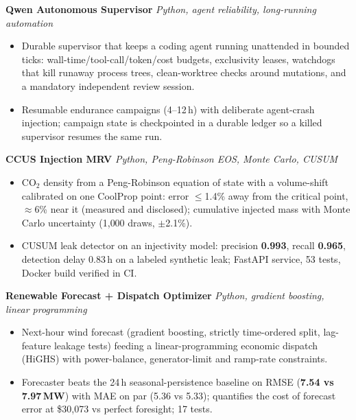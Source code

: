 \documentclass[10pt]{article}
\newcommand{\projectentry}[2]{%
  \noindent\textbf{#1} \hfill \textit{#2}\\[-0.3em]
}
\begin{document}
\projectentry{Qwen Autonomous Supervisor}{Python, agent reliability, long-running automation}
\begin{itemize}
  \item Durable supervisor that keeps a coding agent running unattended in bounded ticks: wall-time/tool-call/token/cost budgets, exclusivity leases, watchdogs that kill runaway process trees, clean-worktree checks around mutations, and a mandatory independent review session.
  \item Resumable endurance campaigns (4--12\,h) with deliberate agent-crash injection; campaign state is checkpointed in a durable ledger so a killed supervisor resumes the same run.
\end{itemize}

\projectentry{CCUS Injection MRV}{Python, Peng-Robinson EOS, Monte Carlo, CUSUM}
\begin{itemize}
  \item CO$_2$ density from a Peng-Robinson equation of state with a volume-shift calibrated on one CoolProp point: error $\leq$1.4\% away from the critical point, $\approx$6\% near it (measured and disclosed); cumulative injected mass with Monte Carlo uncertainty (1{,}000 draws, $\pm$2.1\%).
  \item CUSUM leak detector on an injectivity model: precision \textbf{0.993}, recall \textbf{0.965}, detection delay 0.83\,h on a labeled synthetic leak; FastAPI service, 53 tests, Docker build verified in CI.
\end{itemize}

\projectentry{Renewable Forecast + Dispatch Optimizer}{Python, gradient boosting, linear programming}
\begin{itemize}
  \item Next-hour wind forecast (gradient boosting, strictly time-ordered split, lag-feature leakage tests) feeding a linear-programming economic dispatch (HiGHS) with power-balance, generator-limit and ramp-rate constraints.
  \item Forecaster beats the 24\,h seasonal-persistence baseline on RMSE (\textbf{7.54 vs 7.97\,MW}) with MAE on par (5.36 vs 5.33); quantifies the cost of forecast error at \$30{,}073 vs perfect foresight; 17 tests.
\end{itemize}
\end{document}
